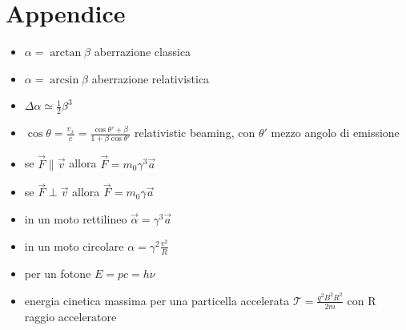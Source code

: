 \documentclass[a4paper]{article}
\begin{document}
    \section{Appendice}
        \begin{itemize}
            \item $\alpha=\arctan{\beta}$ aberrazione classica
            \item $\alpha=\arcsin{\beta}$ aberrazione relativistica
            \item $\Delta\alpha\simeq\frac{1}{2}\beta^3$
            \item $\cos\theta=\frac{v_x}{c}=\frac{\cos\theta'+\beta}{1+\beta\cos\theta'}$ relativistic beaming, con $\theta'$ mezzo angolo di emissione
            \item se $\vec{F}\|\vec{v}$ allora $\vec{F}=m_0\gamma^3\vec{a}$
            \item se $\vec{F}\perp\vec{v}$ allora $\vec{F}=m_0\gamma\vec{a}$
            \item in un moto rettilineo $\vec{\alpha}=\gamma^3\vec{a}$
            \item in un moto circolare $\alpha=\gamma^2\frac{v^2}{R}$
            \item per un fotone $E=pc=h\nu$
            \item energia cinetica massima per una particella accelerata $\mathcal{T}=\frac{q^2B^2R^2}{2m}$ con R raggio acceleratore
        \end{itemize}
\end{document}
